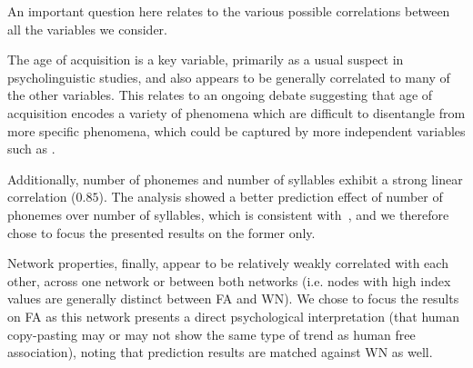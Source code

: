 An important question here relates to the various possible correlations between all the variables we consider.

The age of acquisition is a key variable, primarily as a usual suspect in psycholinguistic studies, and also appears to be generally correlated to many of the other variables.
This relates to an ongoing debate suggesting that age of acquisition encodes a variety of phenomena which are difficult to disentangle from more specific phenomena, which could be captured by more independent variables such as \CN.

Additionally, number of phonemes and number of syllables exhibit a strong linear correlation ($0.85$).
The analysis showed a better prediction effect of number of phonemes over number of syllables, which is consistent with~\citet{nick-diss}, and we therefore chose to focus the presented results on the former only.

\bigskip
Network properties, finally, appear to be relatively weakly correlated with each other, across one network or between both networks (i.e. nodes with high index values are generally distinct between FA and WN).
We chose to focus the results on FA as this network presents a direct psychological interpretation (that human copy-pasting may or may not show the same type of trend as human free association), noting that prediction results are matched against WN as well.

